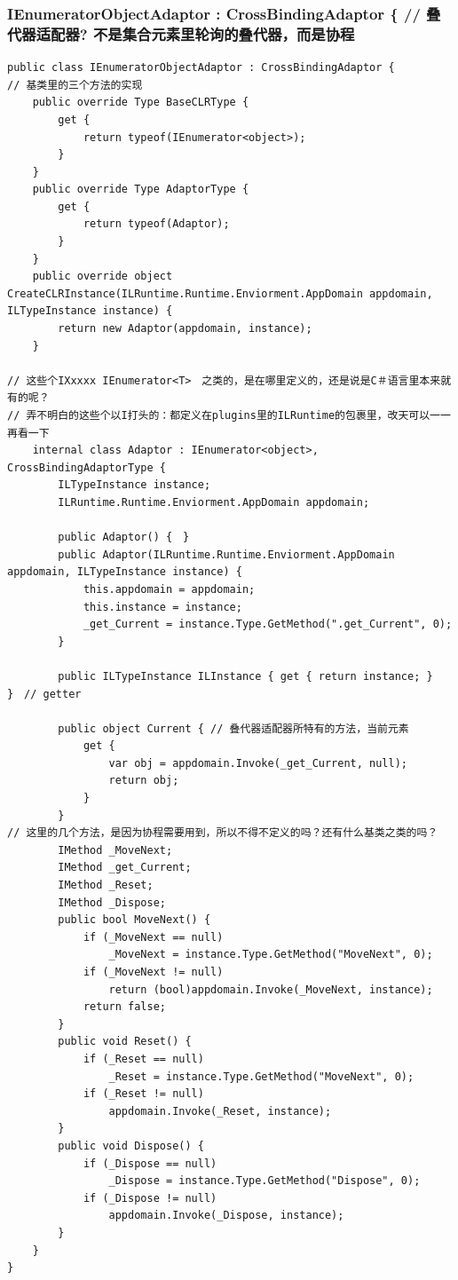 \documentclass[9pt, b5paper]{article}
\begin{document}
\subsubsection{IEnumeratorObjectAdaptor : CrossBindingAdaptor \{ // 叠代器适配器? 不是集合元素里轮询的叠代器，而是协程}
\label{sec-5-1-2}
\begin{verbatim}
public class IEnumeratorObjectAdaptor : CrossBindingAdaptor { 
// 基类里的三个方法的实现
    public override Type BaseCLRType {
        get {
            return typeof(IEnumerator<object>);
        }
    }
    public override Type AdaptorType {
        get {
            return typeof(Adaptor);
        }
    }
    public override object CreateCLRInstance(ILRuntime.Runtime.Enviorment.AppDomain appdomain, ILTypeInstance instance) {
        return new Adaptor(appdomain, instance);
    }

// 这些个IXxxxx IEnumerator<T>　之类的，是在哪里定义的，还是说是C＃语言里本来就有的呢？
// 弄不明白的这些个以I打头的：都定义在plugins里的ILRuntime的包裹里，改天可以一一再看一下
    internal class Adaptor : IEnumerator<object>, CrossBindingAdaptorType {
        ILTypeInstance instance;
        ILRuntime.Runtime.Enviorment.AppDomain appdomain;

        public Adaptor() {　}
        public Adaptor(ILRuntime.Runtime.Enviorment.AppDomain appdomain, ILTypeInstance instance) {
            this.appdomain = appdomain;
            this.instance = instance;
            _get_Current = instance.Type.GetMethod(".get_Current", 0);
        }

        public ILTypeInstance ILInstance { get { return instance; } }　// getter

        public object Current { // 叠代器适配器所特有的方法，当前元素
            get {
                var obj = appdomain.Invoke(_get_Current, null);
                return obj;
            }
        }
// 这里的几个方法，是因为协程需要用到，所以不得不定义的吗？还有什么基类之类的吗？
        IMethod _MoveNext;
        IMethod _get_Current;
        IMethod _Reset;
        IMethod _Dispose;
        public bool MoveNext() {
            if (_MoveNext == null) 
                _MoveNext = instance.Type.GetMethod("MoveNext", 0);
            if (_MoveNext != null)
                return (bool)appdomain.Invoke(_MoveNext, instance);
            return false;
        }
        public void Reset() {
            if (_Reset == null) 
                _Reset = instance.Type.GetMethod("MoveNext", 0);
            if (_Reset != null)
                appdomain.Invoke(_Reset, instance);
        }
        public void Dispose() {
            if (_Dispose == null) 
                _Dispose = instance.Type.GetMethod("Dispose", 0);
            if (_Dispose != null)
                appdomain.Invoke(_Dispose, instance);
        }
    }
}
\end{verbatim}
\end{document}
